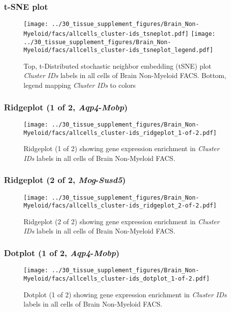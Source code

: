 \clearpage
\subsubsection{t-SNE plot}
\begin{figure}[h]
\centering
\texttt{[image: ../30\_tissue\_supplement\_figures/Brain\_Non-Myeloid/facs/allcells\_cluster-ids\_tsneplot.pdf]}
\texttt{[image: ../30\_tissue\_supplement\_figures/Brain\_Non-Myeloid/facs/allcells\_cluster-ids\_tsneplot\_legend.pdf]}
\caption{Top, t-Distributed stochastic neighbor embedding (tSNE) plot  \emph{Cluster IDs} labels in all cells of Brain Non-Myeloid FACS. Bottom, legend mapping \emph{Cluster IDs} to colors}
\end{figure}


\clearpage

\subsubsection{Ridgeplot (1 of 2, \emph{Aqp4}-\emph{Mobp})}
\begin{figure}[h]
\centering
\texttt{[image: ../30\_tissue\_supplement\_figures/Brain\_Non-Myeloid/facs/allcells\_cluster-ids\_ridgeplot\_1-of-2.pdf]}

\caption{ Ridgeplot (1 of 2)  showing gene expression enrichment in \emph{Cluster IDs} labels in all cells of Brain Non-Myeloid FACS. }
\end{figure}


\clearpage

\subsubsection{Ridgeplot (2 of 2, \emph{Mog}-\emph{Susd5})}
\begin{figure}[h]
\centering
\texttt{[image: ../30\_tissue\_supplement\_figures/Brain\_Non-Myeloid/facs/allcells\_cluster-ids\_ridgeplot\_2-of-2.pdf]}

\caption{ Ridgeplot (2 of 2)  showing gene expression enrichment in \emph{Cluster IDs} labels in all cells of Brain Non-Myeloid FACS. }
\end{figure}


\clearpage

\subsubsection{Dotplot (1 of 2, \emph{Aqp4}-\emph{Mobp})}
\begin{figure}[h]
\centering
\texttt{[image: ../30\_tissue\_supplement\_figures/Brain\_Non-Myeloid/facs/allcells\_cluster-ids\_dotplot\_1-of-2.pdf]}

\caption{ Dotplot (1 of 2)  showing gene expression enrichment in \emph{Cluster IDs} labels in all cells of Brain Non-Myeloid FACS. }
\end{figure}


